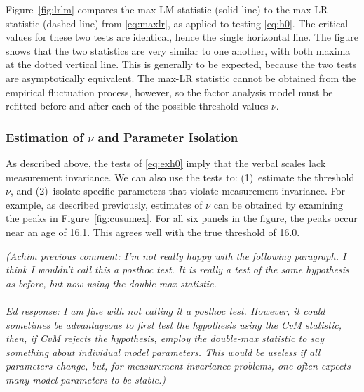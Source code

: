\documentclass[man]{apa}
\newcommand{\readme}[1]{\emph{\marginpar{README} (#1)}}
\begin{document}
Figure~\ref{fig:lrlm} 
compares the max-LM statistic (solid line) to the max-LR
statistic (dashed line) from \eqref{eq:maxlr}, as applied to testing
\eqref{eq:h0}.  The critical values for these two
tests are identical, hence the single horizontal line.
The figure
shows that the two statistics are very similar to one another, with
both maxima at the dotted vertical line.  This
is generally to be expected, because the two tests are asymptotically
equivalent.  The 
max-LR statistic cannot be obtained from the empirical fluctuation
process, however, so the factor analysis model must be refitted before
and after each of the possible threshold values $\nu$.


\subsubsection{Estimation of $\nu$ and Parameter Isolation}
As described above, the tests of \eqref{eq:exh0} imply that the 
verbal scales lack measurement invariance.  
We can also use the tests to: (1)~estimate the 
threshold $\nu$, and (2)~isolate specific parameters that violate
measurement invariance.  
For example, as described previously, estimates of $\nu$ can be obtained by
examining the peaks in Figure~\ref{fig:cusumex}.  For all six panels
in the figure, the peaks occur near an age of 16.1.  This agrees well
with the true threshold of 16.0.

\readme{Achim previous comment: I'm not really happy with the following
  paragraph. I think 
I wouldn't call this a posthoc test. It is really a test of the same
hypothesis as before, but now using the double-max
statistic. \\ \ \\
Ed response: I am fine with not calling it a posthoc test.  However,
it could sometimes be advantageous to first test the hypothesis using the CvM
statistic, then, if CvM rejects the hypothesis, employ the double-max
statistic to say something about individual model parameters.  This
would be useless if all parameters change, but, for measurement
invariance problems, one often expects many model parameters to be stable.}
\end{document}
